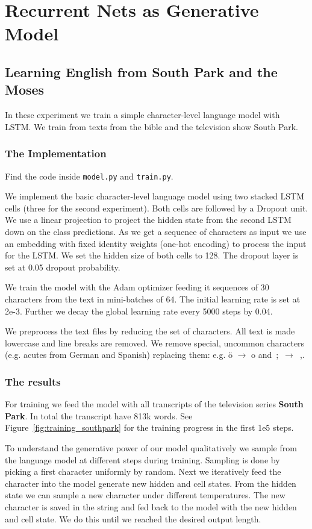 \documentclass{article}
\begin{document}
\section{Recurrent Nets as Generative Model}
\subsection{Learning English from South Park and the Moses}
In these experiment we train a simple character-level language model with LSTM.
We train from texts from the bible and the television show South Park.

\subsubsection{The Implementation}
Find the code inside \texttt{model.py} and \texttt{train.py}.

We implement the basic character-level language model using two stacked LSTM cells (three for the second experiment).
Both cells are followed by a Dropout unit.
We use a linear projection to project the hidden state from the second LSTM down on the class predictions.
As we get a sequence of characters as input we use an embedding with fixed identity weights (one-hot encoding) to process the input for the LSTM.
We set the hidden size of both cells to 128.
The dropout layer is set at 0.05 dropout probability.

We train the model with the Adam optimizer feeding it sequences of 30 characters from the text in mini-batches of 64.
The initial learning rate is set at 2e-3.
Further we decay the global learning rate every 5000 steps by 0.04.

We preprocess the text files by reducing the set of characters.
All text is made lowercase and line breaks are removed.
We remove special, uncommon characters (e.g. acutes from German and Spanish) replacing them: e.g. ö \(\to\) o and\ ;\ \(\to\)\ ,.

\subsubsection{The results}
For training we feed the model with all transcripts of the television series \textbf{South Park}.
In total the transcript have 813k words.
See Figure~\ref{fig:training_southpark} for the training progress in the first 1e5 steps.

To understand the generative power of our model qualitatively we sample from the language model at different steps during training.
Sampling is done by picking a first character uniformly by random.
Next we iteratively feed the character into the model generate new hidden and cell states.
From the hidden state we can sample a new character under different temperatures.
The new character is saved in the string and fed back to the model with the new hidden and cell state.
We do this until we reached the desired output length.
\end{document}
